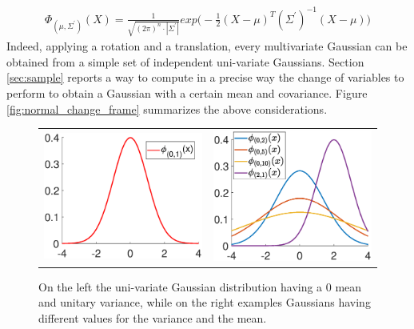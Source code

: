 \documentclass{article}
\begin{document}
\begin{eqnarray}
\Phi_{(\mu, \Sigma^{'})}(X) = \frac{1}{\sqrt{ {(2 \pi)}^n \cdot \left | \Sigma^{'} \right | }  } exp \bigg( -\frac{1}{2} {(X - \mu)}^T ({\Sigma^{'}})^{-1} (X - \mu) \bigg)
\label{eq:Gauss_multi_pdf}
\end{eqnarray}
Indeed, applying a rotation and a translation, every multivariate Gaussian can be obtained from a simple set of independent uni-variate Gaussians. Section \ref{sec:sample} reports a way to compute in a precise way the change of variables to perform to obtain a Gaussian with a certain mean and covariance.
Figure \ref{fig:normal_change_frame} summarizes the above considerations.

\begin{figure}
	\centering
\begin{tabular}{ll}
\begin{minipage}[t]{0.45 \columnwidth}
	\includegraphics[width=0.8 \columnwidth]{./image/normal_01.eps}
\end{minipage}
 & 
\begin{minipage}[t]{0.45 \columnwidth}
	\includegraphics[width=0.8 \columnwidth]{./image/normal_02.eps}
\end{minipage}
\end{tabular}
\caption{On the left the uni-variate Gaussian distribution having a 0 mean and unitary variance, while on the right examples Gaussians having different values for the variance and the mean.}
	\label{fig:normal_mono}
\end{figure} 
\end{document}
